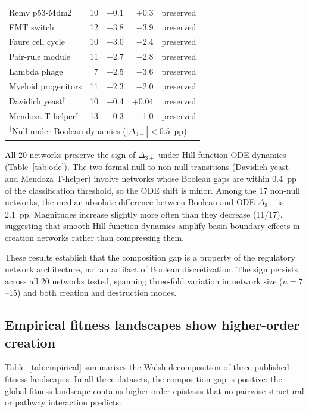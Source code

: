 \documentclass[10pt]{article}
\begin{document}
\begin{table}[t]
\begin{tabular}{lrrrr}
Remy p53-Mdm2$^\dagger$ & 10 & $+$0.1 & $+$0.3 & preserved \\
EMT switch & 12 & $-$3.8 & $-$3.9 & preserved \\
Faure cell cycle & 10 & $-$3.0 & $-$2.4 & preserved \\
Pair-rule module & 11 & $-$2.7 & $-$2.8 & preserved \\
Lambda phage & 7 & $-$2.5 & $-$3.6 & preserved \\
Myeloid progenitors & 11 & $-$2.3 & $-$2.0 & preserved \\
Davidich yeast$^\dagger$ & 10 & $-$0.4 & $+$0.04 & preserved \\
Mendoza T-helper$^\dagger$ & 13 & $-$0.3 & $-$1.0 & preserved \\
\bottomrule
\multicolumn{5}{l}{\footnotesize $^\dagger$Null under Boolean dynamics ($|\Delta_{3+}| < 0.5$~pp).} \\
\end{tabular}
\end{table}

All 20 networks preserve the sign of $\Delta_{3+}$ under
Hill-function ODE dynamics (Table~\ref{tab:ode}). The two formal
null-to-non-null transitions (Davidich yeast and Mendoza T-helper)
involve networks whose Boolean gaps are within 0.4~pp of the
classification threshold, so the ODE shift is minor. Among the 17
non-null networks, the median absolute difference between Boolean and
ODE $\Delta_{3+}$ is 2.1~pp. Magnitudes increase slightly more
often than they decrease (11/17), suggesting that smooth Hill-function
dynamics amplify basin-boundary effects in creation networks rather
than compressing them.

These results establish that the composition gap is a property of
the regulatory network architecture, not an artifact of Boolean
discretization. The sign persists across all 20 networks tested,
spanning three-fold variation in network size ($n = 7$--15) and both
creation and destruction modes.


\subsection{Empirical fitness landscapes show higher-order creation}
\label{sec:empirical-results}

Table~\ref{tab:empirical} summarizes the Walsh decomposition of three
published fitness landscapes. In all three datasets, the composition
gap is positive: the global fitness landscape contains higher-order
epistasis that no pairwise structural or pathway interaction
predicts.
\end{document}
